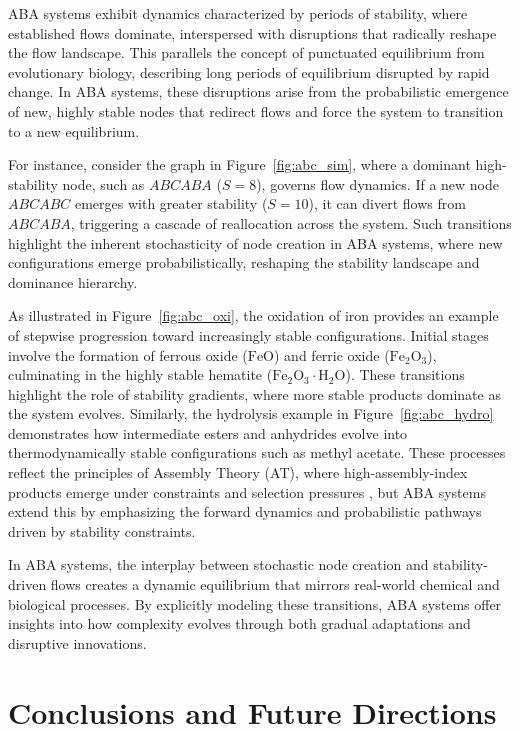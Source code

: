 \documentclass[entropy,article,submit,pdftex,oneauthor]{Definitions/mdpi}
\begin{document}
ABA systems exhibit dynamics characterized by periods of stability, where established flows dominate, interspersed with disruptions that radically reshape the flow landscape. This parallels the concept of punctuated equilibrium from evolutionary biology, describing long periods of equilibrium disrupted by rapid change. In ABA systems, these disruptions arise from the probabilistic emergence of new, highly stable nodes that redirect flows and force the system to transition to a new equilibrium.

For instance, consider the graph in Figure~\ref{fig:abc_sim}, where a dominant high-stability node, such as \( ABCABA \) (\( S = 8 \)), governs flow dynamics. If a new node \( ABCABC \) emerges with greater stability (\( S = 10 \)), it can divert flows from \( ABCABA \), triggering a cascade of reallocation across the system. Such transitions highlight the inherent stochasticity of node creation in ABA systems, where new configurations emerge probabilistically, reshaping the stability landscape and dominance hierarchy.

As illustrated in Figure~\ref{fig:abc_oxi}, the oxidation of iron provides an example of stepwise progression toward increasingly stable configurations. Initial stages involve the formation of ferrous oxide (\( \text{FeO} \)) and ferric oxide (\( \text{Fe}_2\text{O}_3 \)), culminating in the highly stable hematite (\( \text{Fe}_2\text{O}_3 \cdot \text{H}_2\text{O} \)). These transitions highlight the role of stability gradients, where more stable products dominate as the system evolves. Similarly, the hydrolysis example in Figure~\ref{fig:abc_hydro} demonstrates how intermediate esters and anhydrides evolve into thermodynamically stable configurations such as methyl acetate. These processes reflect the principles of Assembly Theory (AT), where high-assembly-index products emerge under constraints and selection pressures \cite{walker2023nature}, but ABA systems extend this by emphasizing the forward dynamics and probabilistic pathways driven by stability constraints.

In ABA systems, the interplay between stochastic node creation and stability-driven flows creates a dynamic equilibrium that mirrors real-world chemical and biological processes. By explicitly modeling these transitions, ABA systems offer insights into how complexity evolves through both gradual adaptations and disruptive innovations.


\section{Conclusions and Future Directions}
\end{document}
